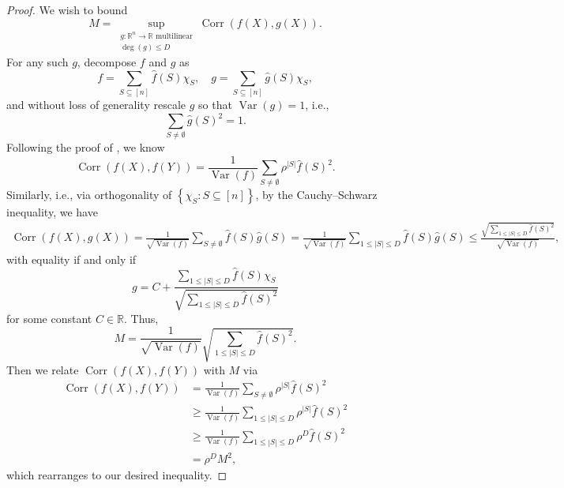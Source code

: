 \documentclass[10pt,a4paper]{amsart}
\def\Corr{\operatorname{Corr}}
\def\R{\mathbb{R}}
\def\Var{\operatorname{Var}}
\def\deg{\operatorname{deg}}
\newcommand{\abs}[1]{\left\lvert#1\right\rvert}
\newcommand{\set}[1]{\left\{#1\right\}}
\begin{document}
\begin{proof}
    We wish to bound
    \[ M = \sup_{\substack{g:\R^n\to\R\text{ multilinear}\\ \deg(g)\leq D}}\Corr(f(X),g(X)). \]
    For any such $g$, decompose $f$ and $g$ as
    \[ f = \sum_{S\subseteq[n]}\widehat f(S)\chi_S, \quad g = \sum_{S\subseteq[n]}\widehat g(S)\chi_S, \]
    and without loss of generality rescale $g$ so that $\Var(g)=1$, i.e.,
    \[ \sum_{S\neq\emptyset}\widehat g(S)^2 = 1. \]
    Following the proof of , we know
    \[ \Corr(f(X),f(Y)) = \frac{1}{\Var(f)}\sum_{S\neq\emptyset}\rho^{\abs{S}}\widehat f(S)^2. \]
    Similarly, i.e., via orthogonality of $\set{\chi_S:S\subseteq[n]}$, by the Cauchy--Schwarz inequality, we have
    \begin{align*}
        \Corr(f(X),g(X))
        = \frac{1}{\sqrt{\Var(f)}}\sum_{S\neq\emptyset}\widehat f(S)\widehat g(S)
        = \frac{1}{\sqrt{\Var(f)}}\sum_{1 \leq \abs{S}\leq D}\widehat f(S)\widehat g(S)
        \leq \frac{\sqrt{\displaystyle\sum_{1\leq\abs{S}\leq D}\widehat f(S)^2}}{\sqrt{\Var(f)}},
    \end{align*}
    with equality if and only if
    \[ g = C+\frac{\displaystyle\sum_{1\leq\abs{S}\leq D}\widehat f(S)\chi_S}{\sqrt{\displaystyle\sum_{1\leq\abs{S}\leq D}\widehat f(S)^2}}\]
    for some constant $C\in\R$.
    Thus,
    \[ M = \frac{1}{\sqrt{\Var(f)}}\sqrt{\sum_{1\leq\abs{S}\leq D}\widehat f(S)^2}. \]
    Then we relate $\Corr(f(X),f(Y))$ with $M$ via
    \begin{align*}
        \Corr(f(X),f(Y))
        &= \frac{1}{\Var(f)}\sum_{S\neq\emptyset}\rho^{\abs{S}}\widehat f(S)^2
        \\ &\geq \frac{1}{\Var(f)}\sum_{1\leq\abs{S}\leq D}\rho^{\abs{S}}\widehat f(S)^2
        \\ &\geq \frac{1}{\Var(f)}\sum_{1\leq\abs{S}\leq D}\rho^D\widehat f(S)^2
        \\ &= \rho^D M^2,
    \end{align*}
    which rearranges to our desired inequality.
\end{proof}
\end{document}
